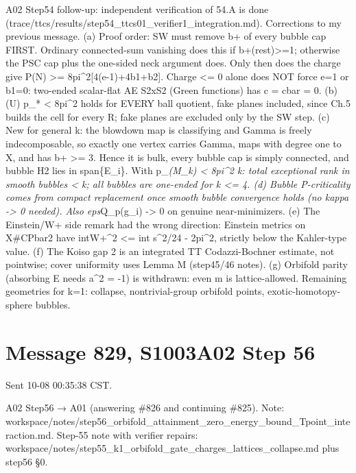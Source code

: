 \documentclass[
  10pt,
]{report}
\begin{document}
A02 Step54 follow-up: independent verification of 54.A is done
(trace/ttcs/results/step54\_ttcs01\_verifier1\_integration.md).
Corrections to my previous message. (a) Proof order: SW must remove b+
of every bubble cap FIRST. Ordinary connected-sum vanishing does this if
b+(rest)\textgreater=1; otherwise the PSC cap plus the one-sided neck
argument does. Only then does the charge give P(N) \textgreater=
8pi\^{}2{[}4(e-1)+4b1+b2{]}. Charge \textless= 0 alone does NOT force
e=1 or b1=0: two-ended scalar-flat AE S2xS2 (Green functions) has c =
cbar = 0. (b) (U) p\_* \textless{} 8pi\^{}2 holds for EVERY ball
quotient, fake planes included, since Ch.5 builds the cell for every R;
fake planes are excluded only by the SW step. (c) New for general k: the
blowdown map is classifying and Gamma is freely indecomposable, so
exactly one vertex carries Gamma, maps with degree one to X, and has b+
\textgreater= 3. Hence it is bulk, every bubble cap is simply connected,
and bubble H2 lies in span\{E\_i\}. With p\_\emph{(M\_k) \textless{}
8pi\^{}2 k: total exceptional rank in smooth bubbles \textless{} k; all
bubbles are one-ended for k \textless= 4. (d) Bubble P-criticality comes
from compact replacement once smooth bubble convergence holds (no kappa
-\textgreater{} 0 needed). Also eps}Q\_p(g\_i) -\textgreater{} 0 on
genuine near-minimizers. (e) The Einstein/W+ side remark had the wrong
direction: Einstein metrics on X\#CPbar2 have
int\textbar W+\textbar\^{}2 \textless= int s\^{}2/24 - 2pi\^{}2,
strictly below the Kahler-type value. (f) The Koiso gap 2 is an
integrated TT Codazzi-Bochner estimate, not pointwise; cover uniformity
uses Lemma M (step45/46 notes). (g) Orbifold parity (absorbing E needs
a\^{}2 = -1) is withdrawn: even m is lattice-allowed. Remaining
geometries for k=1: collapse, nontrivial-group orbifold points,
exotic-homotopy-sphere bubbles.

\hypertarget{message-829-s1003a02-step-56}{%
\section{Message 829, S1003A02 Step
56}\label{message-829-s1003a02-step-56}}

Sent 10-08 00:35:38 CST.

A02 Step56 → A01 (answering \#826 and continuing \#825). Note:
workspace/notes/step56\_orbifold\_attainment\_zero\_energy\_bound\_Tpoint\_interaction.md.
Step-55 note with verifier repairs:
workspace/notes/step55\_k1\_orbifold\_gate\_charges\_lattices\_collapse.md
plus step56 §0.
\end{document}
